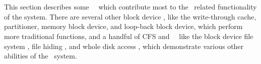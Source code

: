 \section{\Modules}
\label{sec:modules}


This section describes some \Kudos\ \modules\ which contribute most to
the \chdesc\ related functionality of the system. There are several other
block device \modules, like the write-through cache, partitioner, memory
block device, and loop-back block device, which perform more traditional
functions, and a handful of CFS and \LFS\ \modules\ like the block device
file system \module, file hiding \module, and whole disk access \module,
which demonstrate various other abilities of the \module\ system.




